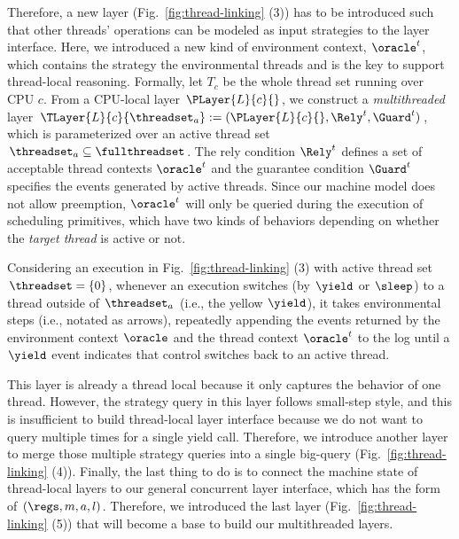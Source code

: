 Therefore,  a new layer (\cf Fig.~\ref{fig:thread-linking} (3)) has to be introduced such that other 
threads' operations can be modeled as input strategies to the layer interface. 
Here, we introduced a new kind of environment context, $\oracle^{t}$, which contains the strategy the environmental threads and is the key to support  thread-local reasoning.
Formally, let $T_c$ be the whole thread set running over CPU $c$.
From a CPU-local layer  $\PLayer{L}{c}{}$,  we construct a 
 \emph{multithreaded} layer $\TLayer{L}{c}{\threadset_a} := (\PLayer{L}{c}{},
 \Rely^t, \Guard^t)$,
which is 
parameterized over an active thread set $\threadset_a \subseteq \fullthreadset$.
The rely condition $\Rely^t$ defines a set of acceptable thread contexts
$\oracle^t$ and the guarantee condition $\Guard^t$ specifies the events generated by active threads. 
Since our machine model does not allow
preemption, $\oracle^t$ will only be queried during the execution of scheduling primitives, 
which have two kinds
of behaviors  depending on whether the \emph{target
thread} is active or not.
Considering an execution in Fig.~\ref{fig:thread-linking} (3) with active thread set
$\threadset = \{0\}$, whenever an execution switches (by $\yield$ or $\sleep$) 
to a thread outside of $\threadset_a$ (i.e., the yellow $\yield$),
it takes environmental steps (i.e., notated as arrows), repeatedly appending the 
events returned by the environment context $\oracle$ and the thread
context $\oracle^t$ to the log until a $\yield$
event indicates that control switches back to an active thread.


This layer is already a thread local because it only captures the behavior of one thread.
However, the strategy query in this layer follows small-step style, and this is insufficient to build thread-local layer interface because we do not want to query multiple times for a single yield call. 
Therefore, we introduce another  layer to merge those multiple strategy queries into a single big-query (\cf Fig.~\ref{fig:thread-linking} (4)). 
Finally, the last thing to do is to connect the machine state of thread-local layers to our general concurrent layer interface, which has the form of $(\regs, m, a, l)$.
Therefore, we introduced the last layer (Fig.~\ref{fig:thread-linking} (5)) that will become a base to build our multithreaded layers.


